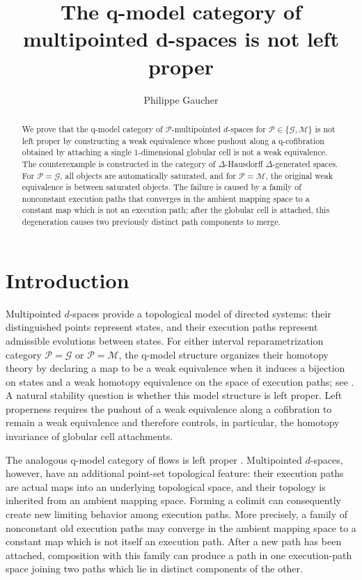 \documentclass[12pt,a4paper]{amsart}
\title{The q-model category of multipointed d-spaces is not left proper}
\author[P. Gaucher]{Philippe Gaucher}
\newcommand{\Pcat}{\mathcal P}
\newcommand{\G}{\mathcal G}
\newcommand{\M}{\mathcal M}
\theoremstyle{definition}
\begin{document}
\begin{abstract}
	We prove that the q-model category of \(\Pcat\)-multipointed \(d\)-spaces for \(\Pcat\in\{\G,\M\}\) is not left proper by constructing a weak equivalence whose pushout along a q-cofibration obtained by attaching a single \(1\)-dimensional globular cell is not a weak equivalence.  The counterexample is constructed in the category of \(\Delta\)-Hausdorff \(\Delta\)-generated spaces.  For \(\Pcat=\G\), all objects are automatically saturated, and for \(\Pcat=\M\), the original weak equivalence is between saturated objects. The failure is caused by a family of nonconstant execution paths that converges in the ambient mapping space to a constant map which is not an execution path; after the globular cell is attached, this degeneration causes two previously distinct path components to merge.
\end{abstract}

\maketitle
\setcounter{tocdepth}{1}
\tableofcontents
\hypersetup{linkcolor = dark-red}



\section{Introduction}

Multipointed \(d\)-spaces provide a topological model of directed systems: their distinguished points represent states, and their execution paths represent admissible evolutions between states.  For either interval reparametrization category \(\Pcat=\G\) or \(\Pcat=\M\), the q-model structure organizes their homotopy theory by declaring a map to be a weak equivalence when it induces a bijection on states and a weak homotopy equivalence on the space of execution paths; see \cite{Moore3}.  A natural stability question is whether this model structure is left proper.  Left properness requires the pushout of a weak equivalence along a cofibration to remain a weak equivalence and therefore controls, in particular, the homotopy invariance of globular cell attachments.

The analogous q-model category of flows is left proper \cite{leftproperflow}. Multipointed \(d\)-spaces, however, have an additional point-set topological feature: their execution paths are actual maps into an underlying topological space, and their topology is inherited from an ambient mapping space.  Forming a colimit can consequently create new limiting behavior among execution paths.  More precisely, a family of nonconstant old execution paths may converge in the ambient mapping space to a constant map which is not itself an execution path. After a new path has been attached, composition with this family can produce a path in one execution-path space joining two paths which lie in distinct components of the other. 
\end{document}
